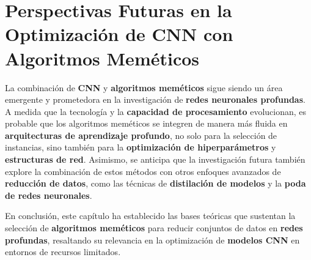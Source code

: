 \section{Perspectivas Futuras en la Optimización de CNN con Algoritmos Meméticos}
\label{sec:perspectivas-futuras-en-la-optimizacion-de-cnn-con-algoritmos-memeticos}
La combinación de \textbf{CNN} y \textbf{algoritmos meméticos} sigue siendo un área emergente y prometedora en la
investigación de \textbf{redes neuronales profundas}.
A medida que la tecnología y la \textbf{capacidad de procesamiento} evolucionan, es probable que los algoritmos
meméticos se integren de manera más fluida en \textbf{arquitecturas de aprendizaje profundo}, no solo para la selección
de instancias, sino también para la \textbf{optimización de hiperparámetros} y \textbf{estructuras de red}.
Asimismo, se anticipa que la investigación futura también explore la combinación de estos métodos con otros enfoques
avanzados de \textbf{reducción de datos}, como las técnicas de \textbf{distilación de modelos} y la
\textbf{poda de redes neuronales}.


En conclusión, este capítulo ha establecido las bases teóricas que sustentan la selección de
\textbf{algoritmos meméticos} para reducir conjuntos de datos en \textbf{redes profundas}, resaltando su relevancia en
la optimización de \textbf{modelos CNN} en entornos de recursos limitados.
